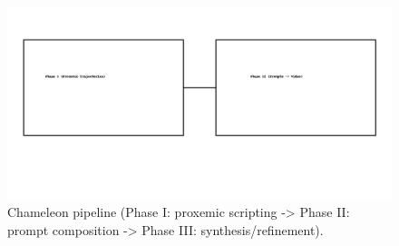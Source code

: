 \
\begin{figure}[t]
  \centering
  \includegraphics[width=\linewidth]{figures/pipeline_overview.png}
  \caption{Chameleon pipeline (Phase I: proxemic scripting -> Phase II: prompt composition -> Phase III: synthesis/refinement).}
  \label{fig:pipeline-overview}
\end{figure}
